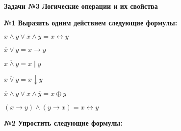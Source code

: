 \usepackage{stmaryrd}%




    \begin{center}
        \textbf{Задачи №3 Логические операции и их свойства}\\
    \end{center}

    \begin{center}
        \textbf{№1 Выразить одним действием следующие формулы:}
    \end{center}

    \begin{enumerate}
        \begin{spacing}{1.5}
            \item $x \wedge y \vee \overline x \wedge \overline y = x \leftrightarrow y$

            \item $\overline x \vee y = x \rightarrow y$

            \item $\overline{x \wedge y} = x \mid y$

            \item $\overline{x \vee y} = x \downarrow y$

            \item $\overline x \wedge y \vee x \wedge \overline y = x \oplus y$

            \item $(x \rightarrow y) \wedge (y \rightarrow x) = x \leftrightarrow y$
        \end{spacing}
    \end{enumerate}


    \begin{center}
        \textbf{№2 Упростить следующие формулы:}
    \end{center}


